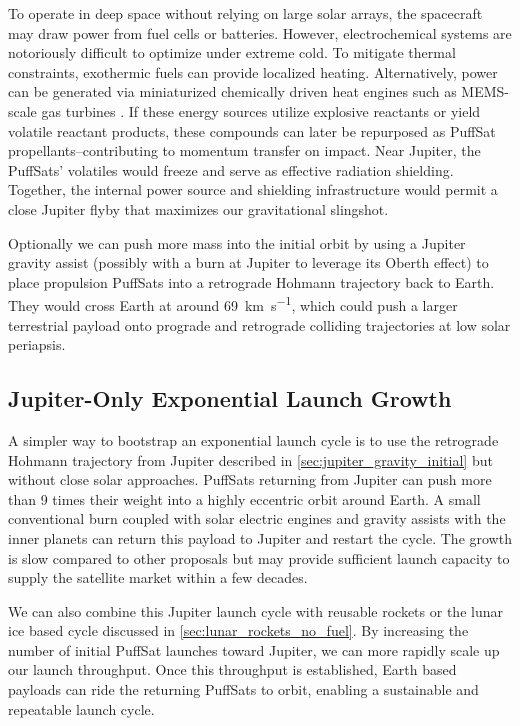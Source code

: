 \documentclass{article}
\begin{document}
{To operate in deep space without relying on large solar arrays, the spacecraft may draw power from fuel cells or batteries. However, electrochemical systems are notoriously difficult to optimize under extreme cold. To mitigate thermal constraints, exothermic fuels can provide localized heating.  Alternatively, power can be generated via miniaturized chemically driven heat engines such as MEMS-scale gas turbines \cite{mems_gas_turbine}. If these energy sources utilize explosive reactants or yield volatile reactant products, these compounds can later be repurposed as PuffSat propellants--contributing to momentum transfer on impact. Near Jupiter, the PuffSats' volatiles would freeze and serve as effective radiation shielding. Together, the internal power source and shielding infrastructure would permit a close Jupiter flyby that maximizes our gravitational slingshot.

Optionally we can push more mass into the initial orbit by using a Jupiter gravity assist (possibly with a burn at Jupiter to leverage its Oberth effect) to place propulsion PuffSats into a retrograde Hohmann trajectory back to Earth.   They would cross Earth at around \SI{69}{\kilo\meter\per\second}, which could push a larger terrestrial payload onto  prograde and retrograde colliding trajectories at low solar periapsis.

\subsection{Jupiter-Only Exponential Launch Growth}\label{sec:jupiter_only_growth}
A simpler way to bootstrap an exponential launch cycle is to use the retrograde Hohmann trajectory from Jupiter described in \autoref{sec:jupiter_gravity_initial} but without close solar approaches.   PuffSats returning from Jupiter can push more than 9 times their weight into a highly eccentric orbit around Earth.   A small conventional burn coupled with solar electric engines and gravity assists with the inner planets can return this payload to Jupiter and restart the cycle.     The growth is slow compared to other proposals but may provide sufficient launch capacity to supply the satellite market within a few decades.

We can also combine this Jupiter launch cycle with reusable rockets or the lunar ice based cycle discussed in \autoref{sec:lunar_rockets_no_fuel}.  By increasing the number of initial PuffSat launches toward Jupiter, we can more rapidly scale up our launch throughput. Once this throughput is established, Earth based payloads can ride the returning PuffSats to orbit, enabling a sustainable and repeatable launch cycle.

}
\end{document}
